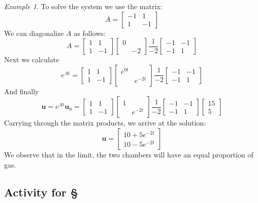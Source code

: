 \documentclass[11pt,oneside]{amsbook}
\theoremstyle{definition}
\theoremstyle{plain}
\theoremstyle{definition}
\theoremstyle{remark}
\newtheorem{example}[theorem]{Example}
\numberwithin{equation}{section}
\numberwithin{figure}{section}
\begin{document}
\begin{example}
  To solve the system we use the matrix:
  \[A=\begin{bmatrix}-1&1\\1&-1\end{bmatrix}
  \]
  We can diagonalize $A$ as follows:
  \[A=\begin{bmatrix}1&1\\1&-1\end{bmatrix}
      \begin{bmatrix}0\\&-2\end{bmatrix}
      \frac{1}{-2}
      \begin{bmatrix}-1&-1\\-1&1\end{bmatrix}
  \]
  Next we calculate
  \[e^{At}=\begin{bmatrix}1&1\\1&-1\end{bmatrix}
    \begin{bmatrix}e^{0t}\\&e^{-2t}\end{bmatrix}
    \frac{1}{-2}
    \begin{bmatrix}-1&-1\\-1&1\end{bmatrix}
  \]
  And finally
  \[\mathbf{u}=e^{At}\mathbf{u}_0
    =\begin{bmatrix}1&1\\1&-1\end{bmatrix}
    \begin{bmatrix}1\\&e^{-2t}\end{bmatrix}
    \frac{1}{-2}
    \begin{bmatrix}-1&-1\\-1&1\end{bmatrix}
    \begin{bmatrix}15\\5\end{bmatrix}
  \]
  Carrying through the matrix products, we arrive at the solution:
  \[\mathbf{u}
    =\begin{bmatrix}10+5e^{-2t}\\10-5e^{-2t}\end{bmatrix}
  \]
  We observe that in the limit, the two chambers will have an equal proportion of gas.
\end{example}

\newpage
\subsection*{Activity for \S \thesection}
\end{document}
